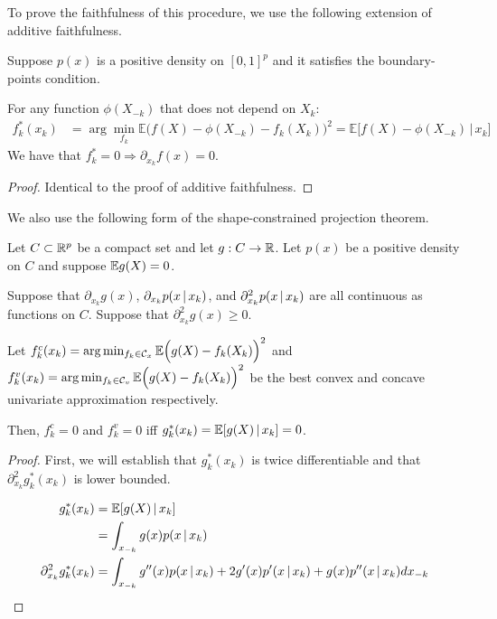 \documentclass{article}
\begin{document}
{To prove the faithfulness of this procedure, we use the following extension of additive faithfulness.

\begin{corollary} 
\label{cor:faithfulness_extension}
Suppose $p(x)$ is a positive density on $[0,1]^p$ and it satisfies the boundary-points condition.

For any function $\phi(X_{-k})$ that does not depend on $X_k$:
 \begin{align*}
f^*_k(x_k) &= \arg\min_{f_k} \mathbb{E} \Big( f(X) 
           - \phi(X_{-k}) - f_k(X_k) \Big)^2 
      = \mathbb{E}\Big[ f(X) - \phi(X_{-k}) \,|\, x_k\Big] 
\end{align*}
We have that $ f^*_k = 0 \Rightarrow \partial_{x_k} f(x) = 0$.
\end{corollary}

\begin{proof}
Identical to the proof of additive faithfulness.
\end{proof}

We also use the following form of the shape-constrained projection theorem.

\begin{proposition}
\label{prop:shape_approx_univariate}
Let $C \subset \mathbb{R}^p$ be a compact set and let $g : C \rightarrow \mathbb{R}$. Let $p(x)$ be a positive density on $C$ and suppose $\mathbb{E} g(X) = 0$.


Suppose that $\partial_{x_k} g(x)$, $\partial_{x_k} p( x \,|\, x_k)$, and $\partial^2_{x_k} p( x \,|\, x_k )$ are all continuous as functions on $C$. Suppose that $\partial^2_{x_k} g(x) \geq 0$.


Let $f^c_k(x_k) = \arg\min_{f_k \in \mathcal{C}_x} \mathbb{E} \Big( g(X) - f_k(X_k) \Big)^2$ and 
$f^v_k(x_k) = \arg\min_{f_k \in \mathcal{C}_v} \mathbb{E} \Big( g(X) - f_k(X_k) \Big)^2$ be the best convex and concave univariate approximation respectively.

Then, $f^c_k = 0$ and $f^v_k = 0$ iff $g^*_k(x_k) = \mathbb{E}[ g(X) \,|\, x_k ] = 0$.
\end{proposition}

\begin{proof}


First, we will establish that $g^*_k(x_k)$ is twice differentiable and that $\partial^2_{x_k} g^*_k(x_k)$ is lower bounded. 

\begin{align*}
g^*_k(x_k) &= \mathbb{E}[ g(X) \,|\, x_k] \\
  &= \int_{x_{-k}} g(x) p(x \,|\, x_k) \\
\partial^2_{x_k} g^*_k(x_k) &= \int_{x_{-k}} g''(x) p(x \,|\, x_k) +
  2 g'(x) p'(x \,|\, x_k) + g(x) p''(x \,|\, x_k) dx_{-k} 
\end{align*}


\end{proof}}
\end{document}
